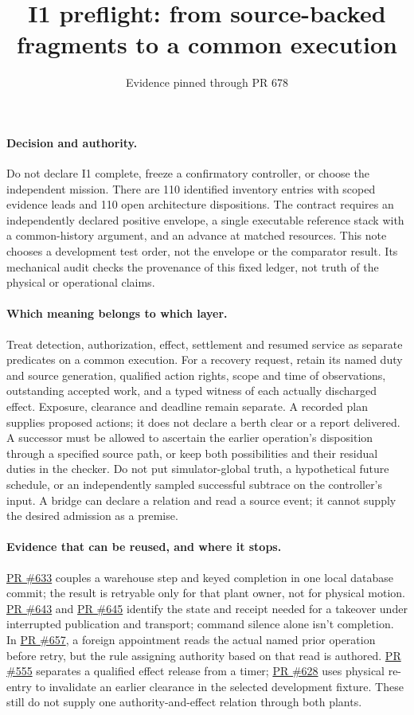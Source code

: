 \documentclass[11pt]{article}
\title{I1 preflight: from source-backed fragments to a common execution}
\author{}\date{Evidence pinned through PR 678}
\newcommand{\pr}[1]{\href{https://github.com/eternal-november/eos-research-programmes/pull/#1}{PR \##1}}
\begin{document}
\maketitle

\paragraph{Decision and authority.}
Do not declare I1 complete, freeze a confirmatory controller, or choose
the independent mission. There are 110 identified inventory entries
with scoped evidence leads and 110 open architecture dispositions.
The contract requires an independently declared positive envelope,
a single executable reference stack with a common-history argument,
and an advance at matched resources. This note chooses a development
test order, not the envelope or the comparator result. Its mechanical
audit checks the provenance of this fixed ledger, not truth of the
physical or operational claims.

\paragraph{Which meaning belongs to which layer.}
Treat detection, authorization, effect, settlement and resumed service
as separate predicates on a common execution. For a recovery request,
retain its named duty and source generation, qualified action rights,
scope and time of observations, outstanding accepted work, and a
typed witness of each actually discharged effect. Exposure, clearance
and deadline remain separate. A recorded plan supplies proposed actions;
it does not declare a berth clear or a report delivered. A successor
must be allowed to ascertain the earlier operation's disposition
through a specified source path, or keep both possibilities and their
residual duties in the checker. Do not put simulator-global truth,
a hypothetical future schedule, or an independently sampled successful
subtrace on the controller's input. A bridge can declare a relation
and read a source event; it cannot supply the desired admission
as a premise.

\paragraph{Evidence that can be reused, and where it stops.}
\pr{633} couples a warehouse step and keyed completion in one local
database commit; the result is retryable only for that plant owner,
not for physical motion. \pr{643} and \pr{645} identify the state and
receipt needed for a takeover under interrupted publication and
transport; command silence alone isn't completion. In \pr{657},
a foreign appointment reads the actual named prior operation before
retry, but the rule assigning authority based on that read is authored.
\pr{555} separates a qualified effect release from a timer;
\pr{628} uses physical re-entry to invalidate an earlier clearance
in the selected development fixture. These still do not supply one
authority-and-effect relation through both plants.
\end{document}
